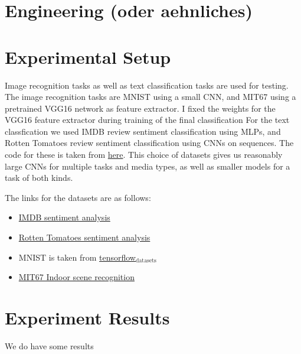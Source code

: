 \documentclass[11pt]{article}
\begin{document}
\section{Engineering (oder aehnliches)}
\label{sec:engineering}

\section{Experimental Setup}
\label{sec:setup}

Image recognition tasks as well as text classification tasks are used for testing.
The image recognition tasks are MNIST using a small CNN, and MIT67 using a pretrained VGG16 network as feature extractor.
I fixed the weights for the VGG16 feature extractor during training of the final classification 
For the text classfication we used IMDB review sentiment classification using MLPs, and Rotten Tomatoes review sentiment classification using CNNs on sequences.
The code for these is taken from \href{https://github.com/google/eng-edu/tree/master/ml/guides/text\_classification}{here}.
This choice of datasets gives us reasonably large CNNs for multiple tasks and media types, as well as smaller models for a task of both kinds.

The links for the datasets are as follows:
\begin{itemize}
\item \href{http://ai.stanford.edu/\~amaas/data/sentiment/aclImdb\_v1.tar.gz}{IMDB sentiment analysis}
\item \href{https://www.kaggle.com/c/3810/download/train.tsv.zip}{Rotten Tomatoes sentiment analysis}
\item MNIST is taken from \href{https://blog.tensorflow.org/2019/02/introducing-tensorflow-datasets.html}{tensorflow\(_{\text{datasets}}\)}
\item \href{https://web.mit.edu/torralba/www/indoor.html}{MIT67 Indoor scene recognition}
\end{itemize}

\section{Experiment Results}
\label{sec:results}

We do have some results
\end{document}
